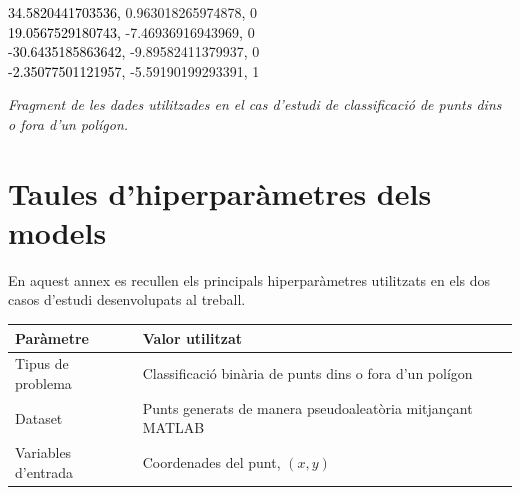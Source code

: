 \documentclass[a4paper,11pt, titlepage, twoside]{article}
\newcommand{\dadesfila}[3]{%
	\textcolor{black}{#1}\textcolor{black}{,}%
	\textcolor{dadesvermell}{#2}\textcolor{black}{,}%
	\textcolor{dadeslila}{#3}%
}
\begin{document}
\begin{appendices}
{\begin{minipage}{0.9\textwidth}
\begin{center}
				\dadesfila{34.5820441703536}{0.963018265974878}{0}\\
				\dadesfila{19.0567529180743}{-7.46936916943969}{0}\\
				\dadesfila{-30.6435185863642}{-9.89582411379937}{0}\\
				\dadesfila{-2.35077501121957}{-5.59190199293391}{1}
			\end{center}
		\end{minipage}
	}
	\vspace{-0.3cm}
	\begin{center}
		\small\textit{Fragment de les dades utilitzades en el cas d'estudi de classificació de punts dins o fora d'un polígon.}
	\end{center}
	\section*{Taules d'hiperparàmetres dels models}
	\label{annex:hiperparametres}

	En aquest annex es recullen els principals hiperparàmetres utilitzats en els dos casos d'estudi desenvolupats al treball.

	\begin{table}[H]
		\centering
		\small

		\begin{tabular}{p{4.2cm} p{8.5cm}}
			\hline
			\textbf{Paràmetre} & \textbf{Valor utilitzat}                                                                                                                                            \\
			\hline

			Tipus de problema
			                   & Classificació binària de punts dins o fora d'un polígon                                                                                                             \\

			Dataset
			                   & Punts generats de manera pseudoaleatòria mitjançant MATLAB                                                                                                          \\

			Variables d'entrada
			                   & Coordenades del punt, $(x,y)$                                                                                                                                       \\


\end{tabular}
\end{table}
\end{appendices}
\end{document}

